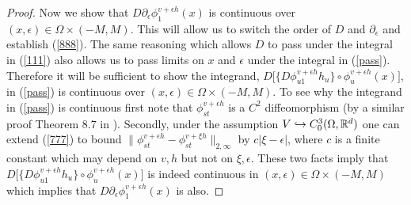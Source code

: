 \documentclass[noinfoline]{imsart}
\begin{document}
\begin{proof}
Now we show that $D {\partial_\epsilon}  \phi^{ v+\epsilon h}_{1}(x)$ is continuous  over $(x,\epsilon)\in \Omega\times (-M,M)$. This will allow us to switch the order of $D$ and $\partial_\epsilon$ and establish (\ref{888}). The same reasoning which allows $D$ to pass under the integral in (\ref{111})  also allows us to pass limits on $x$ and $\epsilon$ under the integral in (\ref{pass}). Therefore it will be sufficient to show the integrand, $ D\bigl[ \{D\phi_{u1}^{v+\epsilon h} h_u  \}\circ \phi_u^{v+\epsilon h}(x)  \bigr]$,  in (\ref{pass}) is continuous  over $(x,\epsilon)\in \Omega\times (-M,M)$.
To see why   the integrand in (\ref{pass})  is continuous first note that $ \phi^{ v+\epsilon h}_{st}$ is a $C^2$ diffeomorphism (by a similar proof Theorem 8.7 in \cite{you:10}). Secondly, under the assumption $V\hookrightarrow C_0^3(\Omega, \Bbb R^d)$ one can extend (\ref{777}) to bound  $\| \phi_{st}^{v+\epsilon h} - \phi_{st}^{v+\xi h} \|_{2,\infty}$ by $c|\xi - \epsilon|$, where $c$ is a finite constant which may depend on $v,h$ but not on $\xi, \epsilon$. These two facts imply that $ D\bigl[ \{D\phi_{u1}^{v+\epsilon h} h_u  \}\circ \phi_u^{v+\epsilon h}(x)  \bigr]$ is indeed continuous in $(x,\epsilon)\in \Omega\times (-M,M)$ which implies that $D {\partial_\epsilon}  \phi^{ v+\epsilon h}_{1}(x)$ is also. 


\end{proof}
\end{document}
